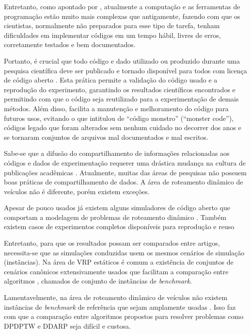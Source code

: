 Entretanto, como apontado por \textcite{merali_computational_2010}, atualmente
a computação e as ferramentas de programação estão muito mais complexas que 
antigamente, fazendo com que os cientistas, normalmente não preparados para 
esse tipo de tarefa, tenham dificuldades em implementar códigos em um tempo 
hábil, livres de erros, corretamente testados e bem documentados.

Portanto, é crucial que todo código e dado utilizado ou produzido durante uma
pesquisa científica deve ser publicado e tornado disponível para todos com
licença de código aberto \cite{ince_case_2012}.
Esta prática permite a validação do código usado e a reprodução do experimento,
garantindo os resultados científicos encontrados e permitindo com que o
código seja reutilizado para a experimentação de demais métodos.
Além disso, facilita a manutenção e melhoramento do código para futuros usos,
evitando o que \textcite{merali_computational_2010} intitulou de ``código
monstro'' (``monster code''), códigos legado que foram alterados sem nenhum
cuidado no decorrer dos anos e se tornaram conjuntos de arquivos mal 
documentados e mal escritos.

Sabe-se que a difusão do compartilhamento de informações relacionadas aos
códigos e dados de experimentação requerer uma drástica mudança na cultura de 
publicações acadêmicas \cite{leveque_reproducible_2012}.
Atualmente, muitas das áreas de pesquisas não possuem boas práticas de 
compartilhamento de dados. 
A área de roteamento dinâmico de veículos não é diferente, porém existem
exceções.

Apesar de pouco usados já existem alguns simuladores de código aberto que 
comportam a modelagem de problemas de roteamento dinâmico 
\cite{maciejewski_towards_2017, van_lon_rinsim:_2012, mayer_open-source_2016}.
Também existem casos de experimentos completos disponíveis para reprodução e
reuso \cite{van_lon_when_2017, van_lon_towards_2015, van_lon_measures_2016}

Entretanto, para que os resultados possam ser comparados entre artigos, 
necessita-se que as simulações conduzidas usem os mesmos cenários de 
simulação (instâncias).
Na área de VRP estáticos é comum a existência de conjuntos de cenários
canônicos extensivamente usados que facilitam a comparação entre 
algoritmos \cite{mendoza_vrp-rep:_2014}, chamados de
conjunto de instâncias de \textit{benchmark}.

Lamentavelmente, na área de roteamento dinâmico de veículos não existem 
instâncias de \textit{benchmark} de referência que sejam amplamente usadas 
\cite{pillac_review_2013, maciejewski_towards_2017}. 
Isso faz com que a comparação entre algoritmos
propostos para resolver problemas como DPDPTW e DDARP seja difícil e custosa.

